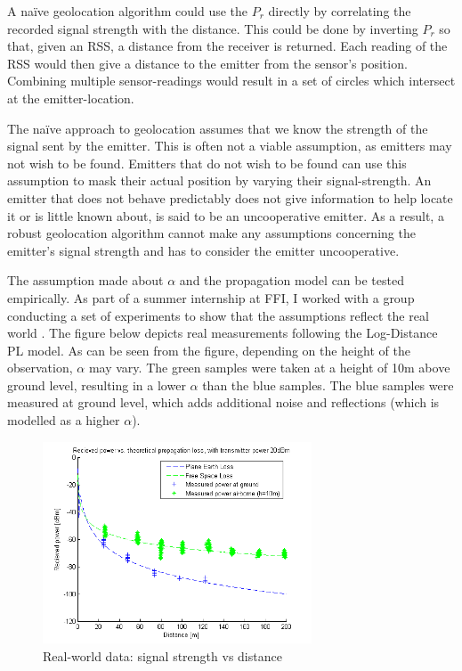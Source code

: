 \documentclass[10pt,a4paper]{book}
\begin{document}
A naïve geolocation algorithm could use the $P_r$ directly by correlating the recorded signal strength with the distance. This could be done by inverting $P_r$ so that, given an \gls{RSS}, a distance from the receiver is returned. Each reading of the \gls{RSS} would then give a distance to the emitter from the sensor's position. Combining multiple sensor-readings would result in a set of circles which intersect at the emitter-location. 



The naïve approach to geolocation assumes that we know the strength of the signal sent by the emitter. This is often not a viable assumption, as emitters may not wish to be found. Emitters that do not wish to be found can use this assumption to mask their actual position by varying their signal-strength. An emitter that does not behave predictably does not give information to help locate it or is little known about, is said to be an uncooperative emitter. As a result, a robust geolocation algorithm cannot make any assumptions concerning the emitter's signal strength and has to consider the emitter uncooperative. 

The assumption made about $\alpha$ and the propagation model can be tested empirically. As part of a summer internship at \gls{FFI}, I worked with a group conducting a set of experiments to show that the assumptions reflect the real world \cite{ffireport2014}. The figure below depicts real measurements following the Log-Distance \gls{PL} model. As can be seen from the figure, depending on the height of the observation, $\alpha$ may vary. The green samples were taken at a height of 10m above ground level, resulting in a lower $\alpha$ than the blue samples. The blue samples were measured at ground level, which adds additional noise and reflections (which is modelled as a higher $\alpha$).

\begin{figure}[H]
\centering
\includegraphics[width=80mm]{Pathlossrealdata.png}
\caption{Real-world data: signal strength vs distance }
\label{pathlossreal}
\end{figure}
\end{document}
